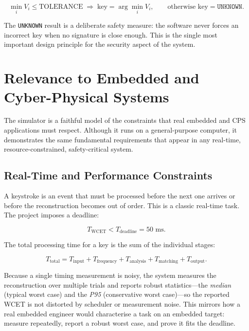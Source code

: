 \documentclass[11pt,a4paper]{article}
\newcommand{\Key}[1]{\texttt{#1}}
\begin{document}
\[
\min_i V_i \le \text{TOLERANCE} \;\Rightarrow\; \text{key} = \arg\min_i V_i,
\qquad\text{otherwise key} = \Key{UNKNOWN}.
\]

The \Key{UNKNOWN} result is a deliberate safety measure: the software never
forces an incorrect key when no signature is close enough. This is the single
most important design principle for the security aspect of the system.

\section{Relevance to Embedded and Cyber-Physical Systems}
\label{sec:whycps}

The simulator is a faithful model of the constraints that real embedded and CPS
applications must respect. Although it runs on a general-purpose computer, it
demonstrates the same fundamental requirements that appear in any real-time,
resource-constrained, safety-critical system.

\subsection{Real-Time and Performance Constraints}

A keystroke is an event that must be processed before the next one arrives or
before the reconstruction becomes out of order. This is a classic real-time
task. The project imposes a deadline:

\[
T_{\text{WCET}} < T_{\text{deadline}} = 50 \text{ ms}.
\]

The total processing time for a key is the sum of the individual stages:

\[
T_{\text{total}} = T_{\text{input}} + T_{\text{frequency}}
+ T_{\text{analysis}} + T_{\text{matching}} + T_{\text{output}}.
\]

Because a single timing measurement is noisy, the system measures the
reconstruction over multiple trials and reports robust statistics---the
\emph{median} (typical worst case) and the \emph{P95} (conservative worst
case)---so the reported WCET is not distorted by scheduler or measurement
noise. This mirrors how a real embedded engineer would characterise a task on
an embedded target: measure repeatedly, report a robust worst case, and prove
it fits the deadline.
\end{document}
